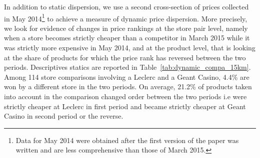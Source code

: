\documentclass[english]{article}
\begin{document}
In addition to static dispersion, we use a second cross-section of prices collected in May 2014\footnote{Data for May 2014 were obtained after the first version of the paper was written and are less comprehensive than those of March 2015.} to achieve a measure of dynamic price dispersion. More precisely, we look for evidence of changes in price rankings at the store pair level, namely when a store becomes strictly cheaper than a competitor in March 2015 while it was strictly more expensive in May 2014, and at the product level, that is looking at the share of products for which the price rank has reversed between the two periods. Descriptives statics are reported in Table~\ref{tab:dynamic_compa_15km}. Among 114 store comparisons involving a Leclerc and a Geant Casino, 4.4\% are won by a different store in the two periods. On average, 21.2\% of products taken into account in the comparison changed order between the two periods i.e were strictly cheaper at Leclerc in first period and became strictly cheaper at Geant Casino in second period or the reverse.
\end{document}
